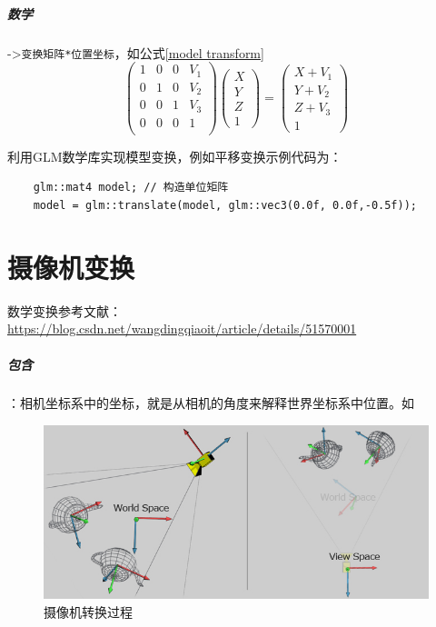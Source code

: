 \documentclass[UTF8,a4paper,12pt]{ctexbook}
\begin{document}
			\subparagraph{数学}->\verb|变换矩阵*位置坐标|，如公式\ref{model transform}
					\begin{equation}\label{model transform}
					\left(
					\begin{array}{cccc}
					1 & 0 & 0& V_1\\
					
					0 & 1 & 0& V_2\\
					
					0 & 0 & 1& V_3\\
					
					0 & 0 & 0& 1\\
					\end{array}
					\right)
					\left(
					\begin{array}{c}
					X\\ 
					Y\\
					Z\\
					1 
					\end{array}	
					\right) 
					=
					\left(
					\begin{array}{c}
					X+V_1\\ 
					Y+V_2\\
					Z+V_3\\
					1 
					\end{array}	
					\right)
					\end{equation}
		
		
			利用GLM数学库实现模型变换，例如平移变换示例代码为：
			\begin{lstlisting}
	glm::mat4 model; // 构造单位矩阵
	model = glm::translate(model, glm::vec3(0.0f, 0.0f,-0.5f));
			\end{lstlisting}
			
	\section{摄像机变换}
			数学变换参考文献：\url{https://blog.csdn.net/wangdingqiaoit/article/details/51570001}
			
			\subparagraph{包含}：相机坐标系中的坐标，就是从相机的角度来解释世界坐标系中位置。如
				\begin{figure}[H]
					\centering
					\includegraphics[width=.8\linewidth]{transferEye.png}
					\caption{摄像机转换过程}
				\end{figure}
			
\end{document}
